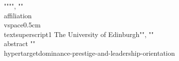 {{{""}"", ""\\affiliation{\\vspace{0.5cm}\\textsuperscript{1} The University of Edinburgh}"", ""\\abstract{%
""\\hypertarget{dominance-prestige-and-leadership-orientation}{%
}}}}
